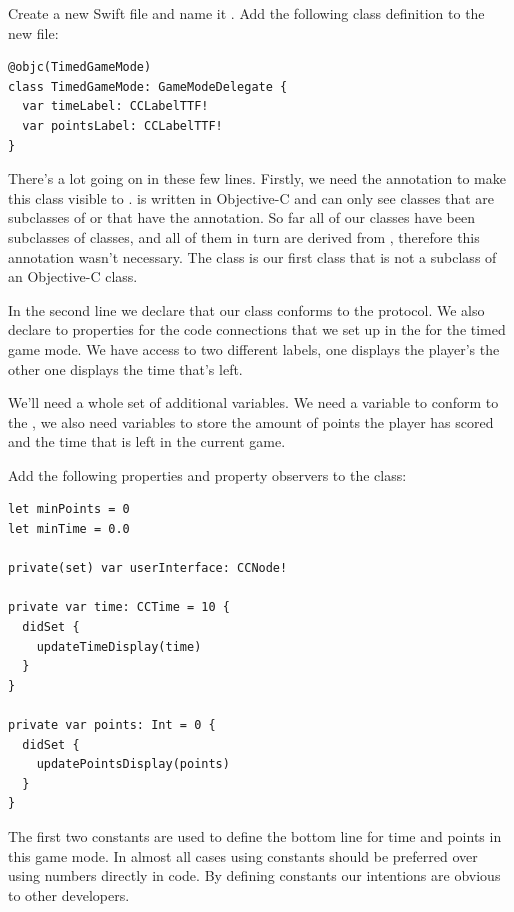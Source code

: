 \begin{leftbar}
Create a new Swift file and name it . Add the
following class definition to the new file:
\begin{lstlisting}
@objc(TimedGameMode)
class TimedGameMode: GameModeDelegate {
  var timeLabel: CCLabelTTF!
  var pointsLabel: CCLabelTTF!
}
\end{lstlisting}
\end{leftbar}
There's a lot going on in these few lines. Firstly, we need the
 annotation to make this class visible to \cocos{}. \cocos{}
is written in Objective-C and can only see classes that are subclasses of
 or that have the  annotation. So far all
of our classes have been subclasses of \cocos{} classes, and all of them in turn
are derived from , therefore this annotation wasn't
necessary. The  class is our first class that is not a
subclass of an Objective-C class.

In the second line we declare that our class conforms to the
 protocol. We also declare to properties
for the code connections that we set up in the \ccbfile{} for the timed game
mode. We have access to two different labels, one displays the player's the
other one displays the time that's left.

We'll need a whole set of additional variables. We need a
 variable to conform to the
, we also need variables to store the amount of
points the player has scored and the time that is left in the current game.

\begin{leftbar}
Add the following properties and property observers to the
 class:
\begin{lstlisting}
let minPoints = 0
let minTime = 0.0

private(set) var userInterface: CCNode!

private var time: CCTime = 10 {
  didSet {
    updateTimeDisplay(time)
  }
}

private var points: Int = 0 {
  didSet {
    updatePointsDisplay(points)
  }
}
\end{lstlisting}
\end{leftbar}
The first two constants are used to define the bottom line for time and points
in this game mode. In almost all cases using constants should be preferred over
using numbers directly in code. By defining constants our intentions are obvious
to other developers.

